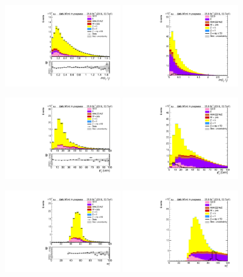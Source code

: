 \begin{figure}[htp]
	\includegraphics[width=0.45\textwidth]{plots/em/DiEta_CR.pdf}
	\includegraphics[width=0.45\textwidth]{plots/em/DiEta_withsignal.pdf}

	\includegraphics[width=0.45\textwidth]{plots/em/DiLepPt_CR.pdf}
	\includegraphics[width=0.45\textwidth]{plots/em/DiLepPt_withsignal.pdf}

	\includegraphics[width=0.45\textwidth]{plots/em/DiTransverseMass_CR.pdf}
	\includegraphics[width=0.45\textwidth]{plots/em/DiTransverseMass_withsignal.pdf}
\end{figure}


